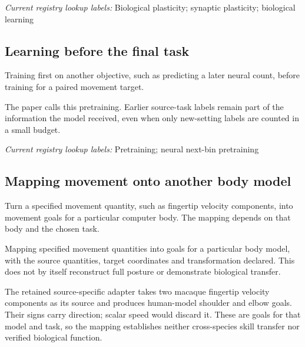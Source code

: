 \noindent\textit{Current registry lookup labels:} Biological plasticity; synaptic plasticity; biological learning\par

\begin{samepage}
\subsection*{Learning before the final task}
\noindent Training first on another objective, such as predicting a later neural count, before training for a paired movement target.\par
\end{samepage}
\begin{samepage}
\noindent The paper calls this pretraining. Earlier source-task labels remain part of the information the model received, even when only new-setting labels are counted in a small budget.\par\nopagebreak[4]

\end{samepage}


\noindent\textit{Current registry lookup labels:} Pretraining; neural next-bin pretraining\par

\begin{samepage}
\subsection*{Mapping movement onto another body model}
\noindent Turn a specified movement quantity, such as fingertip velocity components, into movement goals for a particular computer body. The mapping depends on that body and the chosen task.\par
\end{samepage}
\noindent Mapping specified movement quantities into goals for a particular body model, with the source quantities, target coordinates and transformation declared. This does not by itself reconstruct full posture or demonstrate biological transfer.\par
\begin{samepage}
\noindent The retained source-specific adapter takes two macaque fingertip velocity components as its source and produces human-model shoulder and elbow goals. Their signs carry direction; scalar speed would discard it. These are goals for that model and task, so the mapping establishes neither cross-species skill transfer nor verified biological function.\par\nopagebreak[4]

\end{samepage}


